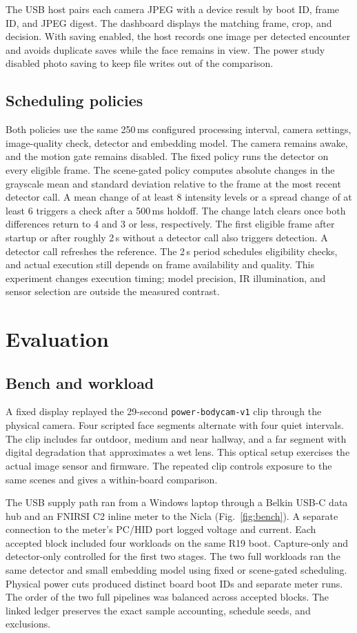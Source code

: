 \documentclass[10pt,letterpaper,twocolumn]{article}
\begin{document}
The USB host pairs each camera JPEG with a device result by boot ID, frame ID, and JPEG digest. The dashboard displays the matching frame, crop, and decision. With saving enabled, the host records one image per detected encounter and avoids duplicate saves while the face remains in view. The power study disabled photo saving to keep file writes out of the comparison.

\subsection{Scheduling policies}
Both policies use the same 250\,ms configured processing interval, camera settings, image-quality check, detector and embedding model. The camera remains awake, and the motion gate remains disabled. The fixed policy runs the detector on every eligible frame. The scene-gated policy computes absolute changes in the grayscale mean and standard deviation relative to the frame at the most recent detector call. A mean change of at least 8 intensity levels or a spread change of at least 6 triggers a check after a 500\,ms holdoff. The change latch clears once both differences return to 4 and 3 or less, respectively. The first eligible frame after startup or after roughly 2\,s without a detector call also triggers detection. A detector call refreshes the reference. The 2\,s period schedules eligibility checks, and actual execution still depends on frame availability and quality. This experiment changes execution timing; model precision, IR illumination, and sensor selection are outside the measured contrast.

\section{Evaluation}
\subsection{Bench and workload}
A fixed display replayed the 29-second \texttt{power-bodycam-v1} clip through the physical camera. Four scripted face segments alternate with four quiet intervals. The clip includes far outdoor, medium and near hallway, and a far segment with digital degradation that approximates a wet lens. This optical setup exercises the actual image sensor and firmware. The repeated clip controls exposure to the same scenes and gives a within-board comparison.

The USB supply path ran from a Windows laptop through a Belkin USB-C data hub and an FNIRSI C2 inline meter to the Nicla (Fig.~\ref{fig:bench}). A separate connection to the meter's PC/HID port logged voltage and current. Each accepted block included four workloads on the same R19 boot. Capture-only and detector-only controlled for the first two stages. The two full workloads ran the same detector and small embedding model using fixed or scene-gated scheduling. Physical power cuts produced distinct board boot IDs and separate meter runs. The order of the two full pipelines was balanced across accepted blocks. The linked ledger preserves the exact sample accounting, schedule seeds, and exclusions.
\end{document}
